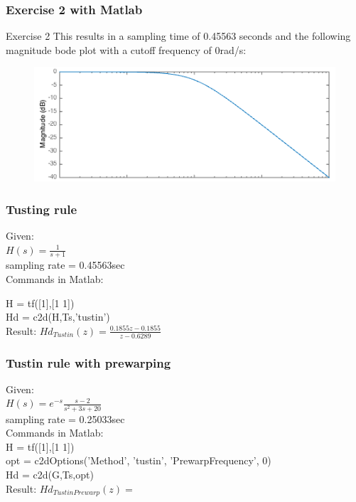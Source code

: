 \begin{frame}
	\frametitle{Exercise 2 with Matlab}
	\begin{block}{Exercise 2}
		This results in a sampling time of 0.45563 seconds and the following magnitude bode plot with a cutoff frequency of 0rad/s:
		\begin{figure}
			\centering
			\includegraphics[width=0.9\linewidth]{bode}
		\end{figure}
		\vspace{0.2em}
	\end{block}
\end{frame}
		
\begin{frame}
	\frametitle{Tusting rule}
	\begin{example}
		Given:\\
		$H(s) = \frac{1}{s + 1} $\\
		sampling rate = 0.45563sec\\
		\vspace{1em}
		Commands in Matlab:
		
		H = tf([1],[1 1]) \\
		Hd = c2d(H,Ts,'tustin')\\
		\vspace{1em}
		Result: 
		$Hd_{Tustin}(z) = \frac{0.1855z - 0.1855}{z - 0.6289}$
	\end{example}
\end{frame}

\begin{frame}
	\frametitle{Tustin rule with prewarping}
	\begin{example}
		Given:\\
		$H(s) = e^{-s} \frac{s-2}{s^{2} + 3s + 20} $\\
		sampling rate = 0.25033sec\\
		\vspace{1em}
		Commands in Matlab:\\
		H = tf([1],[1 1])\\
		opt = c2dOptions('Method', 'tustin', 'PrewarpFrequency', 0)\\
		Hd = c2d(G,Ts,opt)\\
		\vspace{1em}
		Result:
		$Hd_{TustinPrewarp}(z) = $
	\end{example}
\end{frame}

